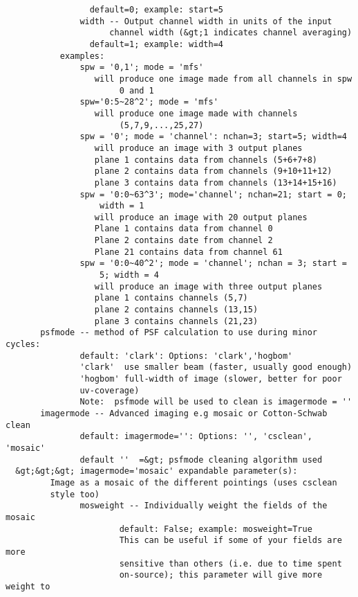 \begin{verbatim}
                 default=0; example: start=5
               width -- Output channel width in units of the input
                     channel width (&gt;1 indicates channel averaging)
                 default=1; example: width=4
           examples:
               spw = '0,1'; mode = 'mfs'
                  will produce one image made from all channels in spw 
                       0 and 1
               spw='0:5~28^2'; mode = 'mfs'
                  will produce one image made with channels 
                       (5,7,9,...,25,27)
               spw = '0'; mode = 'channel': nchan=3; start=5; width=4
                  will produce an image with 3 output planes
                  plane 1 contains data from channels (5+6+7+8)
                  plane 2 contains data from channels (9+10+11+12)
                  plane 3 contains data from channels (13+14+15+16)
               spw = '0:0~63^3'; mode='channel'; nchan=21; start = 0; 
                   width = 1
                  will produce an image with 20 output planes
                  Plane 1 contains data from channel 0
                  Plane 2 contains date from channel 2
                  Plane 21 contains data from channel 61
               spw = '0:0~40^2'; mode = 'channel'; nchan = 3; start = 
                   5; width = 4
                  will produce an image with three output planes
                  plane 1 contains channels (5,7)
                  plane 2 contains channels (13,15)
                  plane 3 contains channels (21,23)
       psfmode -- method of PSF calculation to use during minor cycles:
               default: 'clark': Options: 'clark','hogbom'
               'clark'  use smaller beam (faster, usually good enough)
               'hogbom' full-width of image (slower, better for poor 
               uv-coverage)
               Note:  psfmode will be used to clean is imagermode = ''
       imagermode -- Advanced imaging e.g mosaic or Cotton-Schwab clean
               default: imagermode='': Options: '', 'csclean', 'mosaic'
               default ''  =&gt; psfmode cleaning algorithm used
  &gt;&gt;&gt; imagermode='mosaic' expandable parameter(s):
         Image as a mosaic of the different pointings (uses csclean 
         style too)
               mosweight -- Individually weight the fields of the mosaic
                       default: False; example: mosweight=True
                       This can be useful if some of your fields are more
                       sensitive than others (i.e. due to time spent 
                       on-source); this parameter will give more weight to 

\end{verbatim}
